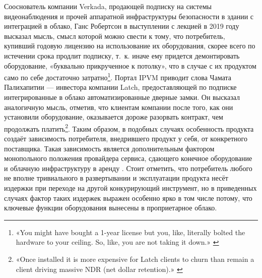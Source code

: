 \documentclass{article}
\begin{document}
Сооснователь компании Verkada, продающей подписку на системы видеонаблюдения и прочей аппаратной инфраструктуры безопасности в здании с интеграцией в облако, Ганс Робертсон в выступлении с лекцией в 2019 году высказал мысль, смысл которой можно свести к тому, что потребитель, купивший годовую лицензию на использование их оборудования, скорее всего по истечении срока продлит подписку, т.~к. иначе ему придется демонтировать оборудование, «буквально прикрученное к потолку», что в случае с их продуктом само по себе достаточно затратно\footnote{«You might have bought a 1-year license but you, like, literally bolted the hardware to your ceiling. So, like, you are not taking it down.» \cite{ipvmHostageAsAServiceExplained2021, verkadaBoltedToYourCeiling2019}}. Портал IPVM приводит слова Чамата Палихапитии — инвестора компании Latch, предоставляющей по подписке интегрированные в облако автоматизированные дверные замки. Он высказал аналогичную мысль, отметив, что клиентам компании после того, как они установили оборудование, оказывается дороже разорвать контракт, чем продолжать платить\footnote{«Once installed it is more expensive for Latch clients to churn than remain a client driving massive NDR (net dollar retention).» \cite{ipvmHostageAsAServiceExplained2021}}. Таким образом, в подобных случаях особенность продукта создаёт зависимость потребителя, внедрившего продукт у себя, от конкретного поставщика. Такая зависимость является дополнительным фактором монопольного положения провайдера сервиса, сдающего конечное оборудование и облачную инфраструктуру в аренду \cite{ipvmHostageAsAServiceExplained2021}. Стоит отметить, что потребитель любого не вполне тривиального в развертывании и эксплуатации продукта несёт издержки при переходе на другой конкурирующий инструмент, но в приведенных случаях фактор таких издержек выражен особенно ярко в том числе потому, что ключевые функции оборудования вынесены в проприетарное облако.
\end{document}
